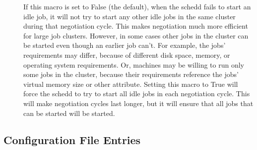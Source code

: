 \begin{description}
\item[]
  \label{param:NegotiateAllJobsInCluster}
  If this macro is set to False (the default), when the schedd fails
  to start an idle job, it will not try to start any other
  idle jobs in the same cluster during that negotiation cycle.  This
  makes negotiation much more efficient for large job clusters.
  However, in some cases other jobs in the cluster can be started even
  though an earlier job can't.  For example, the jobs' requirements
  may differ, because of different disk space, memory, or
  operating system requirements.  Or, machines may be willing to run
  only some jobs in the cluster, because their requirements reference
  the jobs' virtual memory size or other attribute.  Setting this
  macro to True will force the schedd to try to start all idle jobs in
  each negotiation cycle.  This will make negotiation cycles last
  longer, but it will ensure that all jobs that can be started will be
  started.

\end{description}

\subsection{\label{sec:Shadow-Config-File-Entries}
 Configuration File Entries}

